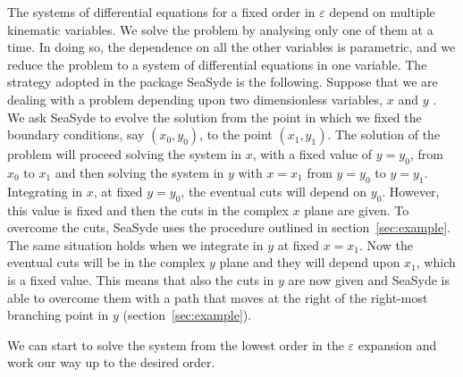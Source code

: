 \documentclass[final,1p,times]{elsarticle}
\begin{document}
The systems of differential equations for a fixed order in $\varepsilon$ depend on multiple kinematic variables. We solve the problem by analysing only one of them at a time. 
In doing so, the dependence on all the other variables is parametric, and we reduce the problem to a system of differential equations in one variable.
The strategy adopted in  the package {\sc SeaSyde} is the following. Suppose that we are dealing with a problem depending upon two dimensionless variables, $x$ and $y$ . We ask {\sc SeaSyde} to evolve the solution from the point in which we fixed the boundary conditions, say $(x_0,y_0)$, to the point $(x_1,y_1)$. The solution of the problem will proceed solving the system in $x$, with a fixed value of $y=y_0$, from $x_0$ to $x_1$ and then solving the system in $y$ with $x=x_1$ from $y=y_0$ to $y=y_1$.
Integrating in $x$, at fixed $y=y_0$, the eventual cuts will depend on $y_0$. However, this value is fixed and then the cuts in the complex $x$ plane are given. To overcome the cuts, {\sc SeaSyde} uses the procedure outlined in section~\ref{sec:example}.
The same situation holds when we integrate in $y$ at fixed $x=x_1$. Now the eventual cuts will be in the complex $y$ plane and they will depend upon $x_1$, which is a fixed value. This means that also the cuts in $y$ are now given and {\sc SeaSyde} is able to overcome them with a path that moves at the right of the right-most branching point in $y$ (section~\ref{sec:example}).










We can start to solve the system from the lowest order in the $\varepsilon$ expansion and work our way up to the desired order.
\end{document}
